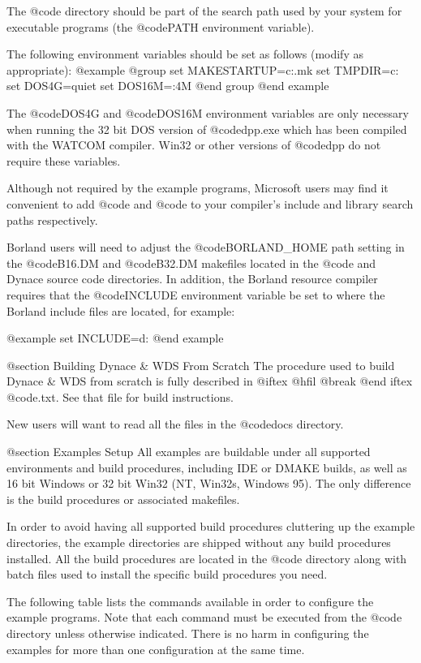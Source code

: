 The @code{\DYANCE\BIN} directory should be part of the search path used
by your system for executable programs (the @code{PATH} environment
variable).

The following environment variables should be set as follows (modify as
appropriate):
@example
@group
set MAKESTARTUP=c:\dynace\utils\startup.mk
set TMPDIR=c:\tmp
set DOS4G=quiet
set DOS16M=:4M
@end group
@end example

The @code{DOS4G} and @code{DOS16M} environment variables are only necessary
when running the 32 bit DOS version of @code{dpp.exe} which has been
compiled with the WATCOM compiler.  Win32 or other versions of @code{dpp}
do not require these variables.

Although not required by the example programs, Microsoft users may find
it convenient to add @code{\DYNACE\INCLUDE} and @code{\DYNACE\LIB} to
your compiler's include and library search paths respectively.

Borland users will need to adjust the @code{BORLAND_HOME} path setting
in the @code{B16.DM} and @code{B32.DM} makefiles located in the
@code{\DYNACE\WINEXAM\SETUP} and Dynace source code directories.  In
addition, the Borland resource compiler requires that the @code{INCLUDE}
environment variable be set to where the Borland include files are
located, for example:

@example
set INCLUDE=d:
@end example


@section Building Dynace & WDS From Scratch
The procedure used to build Dynace & WDS from scratch is fully described
in 
@iftex
@hfil @break 
@end iftex
@code{\DYNACE\DOCS\BUILD.txt}.  See that file for build
instructions.

New users will want to read all the files in the @code{docs} directory.


@section Examples Setup
All examples are buildable under all supported environments and build
procedures, including IDE or DMAKE builds, as well as 16 bit Windows or
32 bit Win32 (NT, Win32s, Windows 95).  The only difference is the build
procedures or associated makefiles.

In order to avoid having all supported build procedures cluttering up
the example directories, the example directories are shipped
without any build procedures installed.  All the build procedures
are located in the @code{\DYNACE\WINEXAM\SETUP} directory along
with batch files used to install the specific build procedures you
need.

The following table lists the commands available in order to configure
the example programs.  Note that each command must be executed from the
@code{\DYNACE\WINEXAM\SETUP} directory unless otherwise indicated.
There is no harm in configuring the examples for more than one
configuration at the same time.

